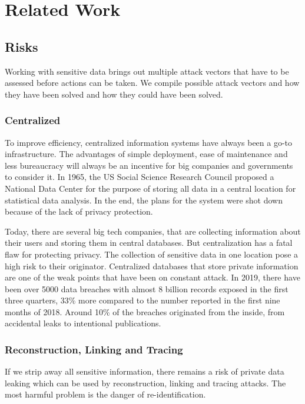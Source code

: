
\chapter{Related Work}\label{chapter:relatedwork}
\section{Risks}
Working with sensitive data brings out multiple attack vectors that have to be assessed before actions can be taken. We compile possible attack vectors and how they have been solved and how they could have been solved.

\subsection{Centralized}
To improve efficiency, centralized information systems have always been a go-to infrastructure. The advantages of simple deployment, ease of maintenance and less bureaucracy will always be an incentive for big companies and governments to consider it. In 1965, the US Social Science Research Council proposed a National Data Center for the purpose of storing all data in a central location for statistical data analysis. In the end, the plans for the system were shot down because of the lack of privacy protection.

Today, there are several big tech companies, that are collecting information about their users and storing them in central databases. But centralization has a fatal flaw for protecting privacy. The collection of sensitive data in one location pose a high risk to their originator. Centralized databases that store private information are one of the weak points that have been on constant attack. In 2019, there have been over 5000 data breaches with almost 8 billion records exposed in the first three quarters, 33\% more compared to the number reported in the first nine months of 2018. Around 10\% of the breaches originated from the inside, from accidental leaks to intentional publications.

\subsection{Reconstruction, Linking and Tracing}
If we strip away all sensitive information, there remains a risk of private data leaking which can be used by reconstruction, linking and tracing attacks. The most harmful problem is the danger of re-identification. 

